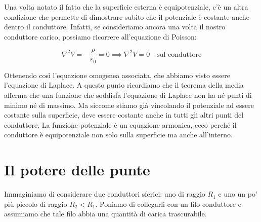 \begin{figure}[htpb]
\end{figure}
\FloatBarrier

Una volta notato il fatto che la superficie esterna è equipotenziale, c'è un altra condizione che permette di dimostrare subito che il potenziale è costante anche dentro il conduttore. Infatti, se consideriamo ancora una volta il nostro conduttore carico, possiamo ricorrere all'equazione di Poisson:

\[
	\nabla^2 V = -\frac{\rho}{\varepsilon_0} = 0 \implies \nabla^2 V = 0\quad \text{sul conduttore}
\]

Ottenendo così l'equazione omogenea associata, che abbiamo visto essere l'equazione di Laplace. A questo punto ricordiamo che il teorema della media afferma che una funzione che soddisfa l'equazione di Laplace non ha né punti di minimo né di massimo. Ma siccome stiamo già vincolando il potenziale ad essere costante sulla superficie, deve essere costante anche in tutti gli altri punti del conduttore. La funzione potenziale è un equazione armonica, ecco perché il conduttore è equipotenziale non solo sulla superficie ma anche all'interno.

\section{Il potere delle punte}

Immaginiamo di considerare due conduttori sferici: uno di raggio $R_1 $ e uno un po' più piccolo di raggio $R_2<R_1$. Poniamo di collegarli con un filo conduttore e assumiamo che tale filo abbia una quantità di carica trascurabile.

